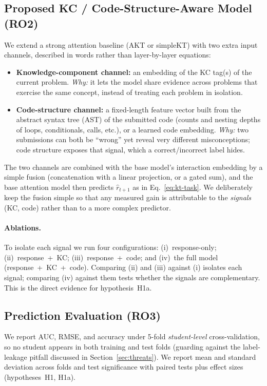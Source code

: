 \subsection{Proposed KC / Code-Structure-Aware Model (RO2)}
\label{sec:model}
We extend a strong attention baseline (AKT or simpleKT) with two extra
input channels, described in words rather than layer-by-layer equations:

\begin{itemize}
  \item \textbf{Knowledge-component channel:} an embedding of the KC
        tag(s) of the current problem. \emph{Why:} it lets the model share
        evidence across problems that exercise the same concept, instead
        of treating each problem in isolation.
  \item \textbf{Code-structure channel:} a fixed-length feature vector
        built from the abstract syntax tree (AST) of the submitted code
        (counts and nesting depths of loops, conditionals, calls, etc.),
        or a learned code embedding. \emph{Why:} two submissions can both
        be ``wrong'' yet reveal very different misconceptions; code
        structure exposes that signal, which a correct/incorrect label
        hides.
\end{itemize}

The two channels are combined with the base model's interaction
embedding by a simple fusion (concatenation with a linear projection, or
a gated sum), and the base attention model then predicts
$\hat{r}_{t+1}$ as in Eq.~\eqref{eq:kt-task}. We deliberately keep the
fusion simple so that any measured gain is attributable to the
\emph{signals} (KC, code) rather than to a more complex predictor.

\paragraph{Ablations.}
To isolate each signal we run four configurations: (i)~response-only;
(ii)~response~+~KC; (iii)~response~+~code; and (iv)~the full model
(response~+~KC~+~code). Comparing (ii) and (iii) against (i) isolates each
signal; comparing (iv) against them tests whether the signals are
complementary. This is the direct evidence for hypothesis~H1a.

\subsection{Prediction Evaluation (RO3)}
\label{sec:pred-eval}
We report AUC, RMSE, and accuracy under 5-fold \emph{student-level}
cross-validation, so no student appears in both training and test folds
(guarding against the label-leakage pitfall discussed in
Section~\ref{sec:threats}). We report mean and standard deviation across
folds and test significance with paired tests plus effect sizes
(hypotheses~H1, H1a).

